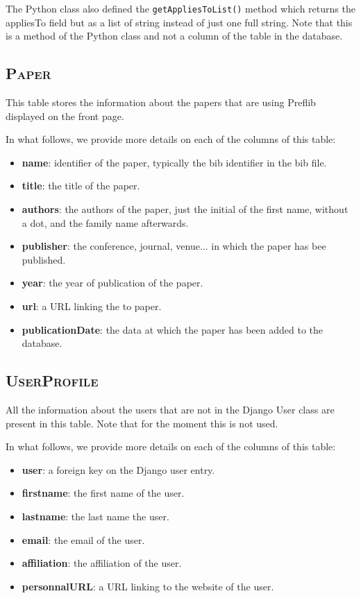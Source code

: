 \documentclass{report}
\begin{document}
	The Python class also defined the \texttt{getAppliesToList()} method which returns the appliesTo field but as a list of string instead of just one full string. Note that this is a method of the Python class and not a column of the table in the database.

	\subsection*{\faDatabase{} \textsc{Paper}}
	
	This table stores the information about the papers that are using Preflib displayed on the front page.
	
	In what follows, we provide more details on each of the columns of this table:
	\begin{itemize}
		\item \textbf{name}: identifier of the paper, typically the bib identifier in the bib file.
		\item \textbf{title}: the title of the paper.
		\item \textbf{authors}: the authors of the paper, just the initial of the first name, without a dot, and the family name afterwards.
		\item \textbf{publisher}: the conference, journal, venue... in which the paper has bee published.
		\item \textbf{year}: the year of publication of the paper.
		\item \textbf{url}: a URL linking the to paper.
		\item \textbf{publicationDate}: the data at which the paper has been added to the database.
	\end{itemize}

	\subsection*{\faDatabase{} \textsc{UserProfile}}
	
	All the information about the users that are not in the Django User class are present in this table. Note that for the moment this is not used.
	
	In what follows, we provide more details on each of the columns of this table:
	\begin{itemize}
		\item \textbf{user}: a foreign key on the Django user entry.
		\item \textbf{firstname}: the first name of the user.
		\item \textbf{lastname}: the last name the user.
		\item \textbf{email}: the email of the user.
		\item \textbf{affiliation}: the affiliation of the user.
		\item \textbf{personnalURL}: a URL linking to the website of the user.
	\end{itemize}
	
\end{document}
